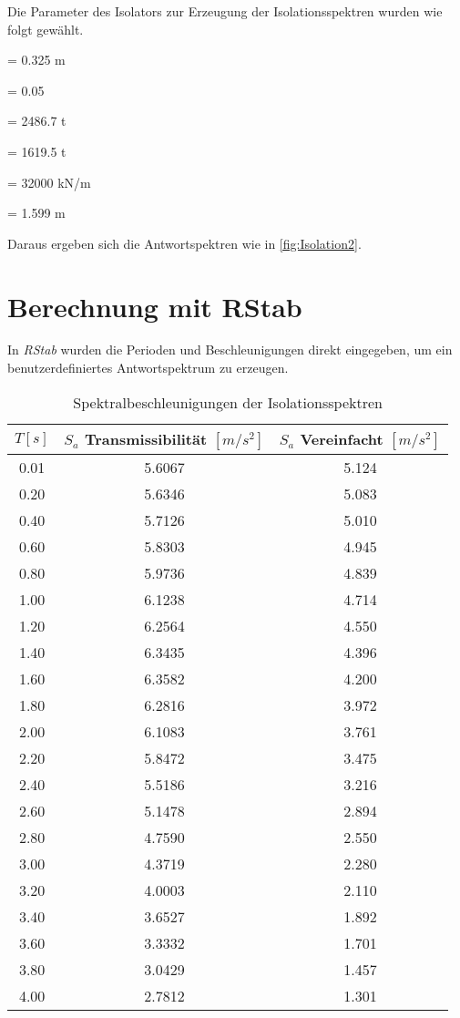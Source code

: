 Die Parameter des Isolators zur Erzeugung der Isolationsspektren wurden wie folgt gewählt.

    = 0.325 m \par
\makebox[1cm]{$\mu$}  = 0.05\par
{}  = 2486.7 t\par
{}  = 1619.5 t\par
{}  = 32000 kN/m \par
{}    = 1.599 m\par

Daraus ergeben sich die Antwortspektren wie in \cref{fig:Isolation2}.

\pagebreak

\section{Berechnung mit RStab}
\label{sec:rstab}

In \emph{RStab} wurden die Perioden und Beschleunigungen direkt eingegeben, um ein benutzerdefiniertes Antwortspektrum zu erzeugen.

\begin{table}[H]
\centering
\begin{tabular}{ |c|c|c| } 
 \hline
 $T [s]$ & $S_a$ Transmissibilität $[m/s^2]$ & $S_a$ Vereinfacht $[m/s^2]$\\
 \hline\hline
0.01 & 5.6067 & 5.124\\
0.20 & 5.6346 & 5.083\\
0.40 & 5.7126 & 5.010\\
0.60 & 5.8303 & 4.945\\
0.80 & 5.9736 & 4.839\\
1.00 & 6.1238 & 4.714\\
1.20 & 6.2564 & 4.550\\
1.40 & 6.3435 & 4.396\\
1.60 & 6.3582 & 4.200\\
1.80 & 6.2816 & 3.972\\
2.00 & 6.1083 & 3.761\\
2.20 & 5.8472 & 3.475\\
2.40 & 5.5186 & 3.216\\
2.60 & 5.1478 & 2.894\\
2.80 & 4.7590 & 2.550\\
3.00 & 4.3719 & 2.280\\
3.20 & 4.0003 & 2.110\\
3.40 & 3.6527 & 1.892\\
3.60 & 3.3332 & 1.701\\
3.80 & 3.0429 & 1.457\\
4.00 & 2.7812 & 1.301\\
 \hline
\end{tabular}
\caption{Spektralbeschleunigungen der Isolationsspektren}
\end{table}

